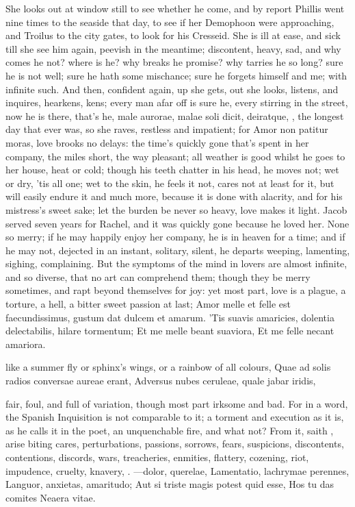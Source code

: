 She looks out at window still to see whether he come, and by
report Phillis went nine times to the seaside that day, to see if her
Demophoon were approaching, and Troilus to the city gates, to
look for his Cresseid. She is ill at ease, and sick till she see him
again, peevish in the meantime; discontent, heavy, sad, and why comes
he not? where is he? why breaks he promise? why tarries he so long?
sure he is not well; sure he hath some mischance; sure he forgets
himself and me; with infinite such. And then, confident again, up she
gets, out she looks, listens, and inquires, hearkens, kens; every man
afar off is sure he, every stirring in the street, now he is there,
that's he, male aurorae, malae soli dicit, deiratque, \etc{}, the longest
day that ever was, so she raves, restless and impatient; for Amor non
patitur moras, love brooks no delays: the time's quickly gone that's
spent in her company, the miles short, the way pleasant; all weather is
good whilst he goes to her house, heat or cold; though his teeth
chatter in his head, he moves not; wet or dry, 'tis all one; wet to the
skin, he feels it not, cares not at least for it, but will easily
endure it and much more, because it is done with alacrity, and for his
mistress's sweet sake; let the burden be never so heavy, love makes it
light. Jacob served seven years for Rachel, and it was quickly
gone because he loved her. None so merry; if he may happily enjoy her
company, he is in heaven for a time; and if he may not, dejected in an
instant, solitary, silent, he departs weeping, lamenting, sighing,
complaining.
But the symptoms of the mind in lovers are almost infinite, and so
diverse, that no art can comprehend them; though they be merry
sometimes, and rapt beyond themselves for joy: yet most part, love is a
plague, a torture, a hell, a bitter sweet passion at last; Amor
melle et felle est faecundissimus, gustum dat dulcem et amarum. 'Tis
suavis amaricies, dolentia delectabilis, hilare tormentum;
Et me melle beant suaviora,
Et me felle necant amariora.

like a summer fly or sphinx's wings, or a rainbow of all colours,
Quae ad solis radios conversae aureae erant,
Adversus nubes ceruleae, quale jabar iridis,

fair, foul, and full of variation, though most part irksome and bad.
For in a word, the Spanish Inquisition is not comparable to it; a
torment and execution as it is, as he calls it in the poet, an
unquenchable fire, and what not? From it, saith \Austin{}, arise
biting cares, perturbations, passions, sorrows, fears, suspicions,
discontents, contentions, discords, wars, treacheries, enmities,
flattery, cozening, riot, impudence, cruelty, knavery, \etc{}.
---dolor, querelae,
Lamentatio, lachrymae perennes,
Languor, anxietas, amaritudo;
Aut si triste magis potest quid esse,
Hos tu das comites Neaera vitae.

